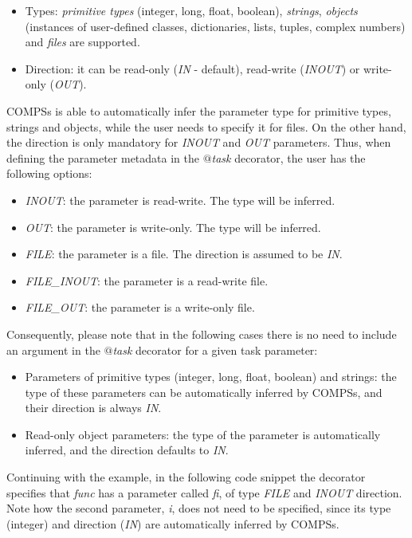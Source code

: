 \begin{itemize}
 \item Types: {\it primitive types} (integer, long, float, boolean), {\it strings}, {\it objects} (instances of user-defined classes, dictionaries, lists, tuples, complex numbers) and {\it files} are supported.
 \item Direction: it can be read-only ({\it IN} - default), read-write ({\it INOUT}) or write-only ({\it OUT}).
\end{itemize}

COMPSs is able to automatically infer the parameter type for primitive types, strings and objects, 
while the user needs to specify it for files. On the other hand, the direction is only mandatory for 
{\it INOUT} and {\it OUT} parameters. Thus, when defining the parameter metadata in the {\it $@$task} 
decorator, the user has the following options:

\begin{itemize}
 \item {\it INOUT}: the parameter is read-write. The type will be inferred.
 \item {\it OUT}: the parameter is write-only. The type will be inferred.
 \item {\it FILE}: the parameter is a file. The direction is assumed to be {\it IN}.
 \item {\it FILE\_INOUT}: the parameter is a read-write file.
 \item {\it FILE\_OUT}: the parameter is a write-only file.
\end{itemize}
     
Consequently, please note that in the following cases there is no need to include an argument in 
the {\it $@$task} decorator for a given task parameter:

\begin{itemize}
 \item Parameters of primitive types (integer, long, float, boolean) and strings: the type of these 
       parameters can be automatically inferred by COMPSs, and their direction is always {\it IN}.
 \item Read-only object parameters: the type of the parameter is automatically inferred, and the 
       direction defaults to {\it IN}.
\end{itemize}
 
Continuing with the example, in the following code snippet the decorator specifies that {\it func} 
has a parameter called {\it fi}, of type {\it FILE} and {\it INOUT} direction. Note how the second 
parameter, {\it i}, does not need to be specified, since its type (integer) and direction ({\it IN}) 
are automatically inferred by COMPSs.

